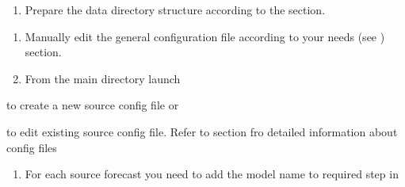 \documentclass[letterpaper,10pt,english]{sphinxmanual}
\begin{document}
\begin{sphinxVerbatim}[commandchars=\\\{\}]
   
\end{sphinxVerbatim}
\begin{enumerate}
\def\theenumi{\arabic{enumi}}
\def\labelenumi{\theenumi .}
\makeatletter\def\p@enumii{\p@enumi \theenumi .}\makeatother
\setcounter{enumi}{3}
\item {} 
Prepare the data directory structure according to the {\hyperref[\detokenize{howitworks/index:dir-structure}]{}} section.

\end{enumerate}

\begin{sphinxVerbatim}[commandchars=\\\{\}]
  
\end{sphinxVerbatim}
\begin{enumerate}
\def\theenumi{\arabic{enumi}}
\def\labelenumi{\theenumi .}
\makeatletter\def\p@enumii{\p@enumi \theenumi .}\makeatother
\setcounter{enumi}{4}
\item {} 
Manually edit the general configuration file  according to your needs (see {\hyperref[\detokenize{configuration/index:gen-config}]{}}) section.

\item {} 
From the main directory launch

\end{enumerate}

\begin{sphinxVerbatim}[commandchars=\\\{\}]
  
\end{sphinxVerbatim}

to create a new source config file or

\begin{sphinxVerbatim}[commandchars=\\\{\}]
  
\end{sphinxVerbatim}

to edit existing source config file.
Refer to {\hyperref[\detokenize{configuration/index:configuration}]{}} section fro detailed information about config files
\begin{enumerate}
\def\theenumi{\arabic{enumi}}
\def\labelenumi{\theenumi .}
\makeatletter\def\p@enumii{\p@enumi \theenumi .}\makeatother
\setcounter{enumi}{6}
\item {} 
For each source forecast  you need to add the model name to required step in  {\hyperref[\detokenize{configuration/index:proc-config}]{}}

\end{enumerate}
\end{document}
